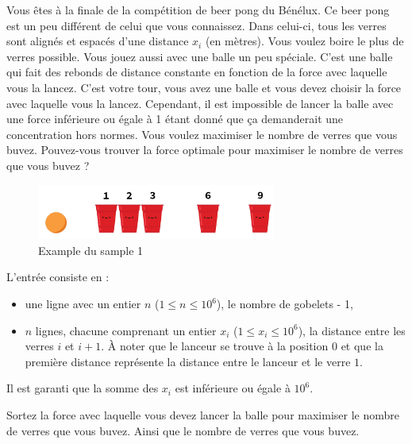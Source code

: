 \problemname{\problemyamlname}


\newcommand{\maxn}{10^{6}}

Vous êtes à la finale de la compétition de beer pong du Bénélux. Ce beer pong est un peu différent de celui que vous connaissez. Dans celui-ci, tous les verres sont alignés et espacés d'une distance $x_i$ (en mètres). Vous voulez boire le plus de verres possible. Vous jouez aussi avec une balle un peu spéciale. C'est une balle qui fait des rebonds de distance constante en fonction de la force avec laquelle vous la lancez.
C'est votre tour, vous avez une balle et vous devez choisir la force avec laquelle vous la lancez. Cependant, il est impossible de lancer la balle avec une force inférieure ou égale à 1 étant donné que ça demanderait une concentration hors normes. Vous voulez maximiser le nombre de verres que vous buvez. Pouvez-vous trouver la force optimale pour maximiser le nombre de verres que vous buvez ?
\smallskip
\begin{figure}[h]
    \centering
    \includegraphics[width=0.7\textwidth]{illustration.png}
    \caption{Example du sample 1}
\end{figure}

\begin{Input}
    L'entrée consiste en :
    \begin{itemize}
        \item une ligne avec un entier  $n$ ($1\leq n\leq \maxn$), le nombre de gobelets - 1,
        \item $n$ lignes, chacune comprenant un entier $x_i$ ($1\leq x_i\leq \maxn$), la distance entre les verres $i$ et $i+1$. À noter que le lanceur se trouve à la position $0$ et que la première distance représente la distance entre le lanceur et le verre $1$.
    \end{itemize}
    Il est garanti que la somme des $x_i$ est inférieure ou égale à $\maxn$.
\end{Input}

\begin{Output}
    Sortez la force avec laquelle vous devez lancer la balle pour maximiser le nombre de verres que vous buvez. Ainsi que le nombre de verres que vous buvez.
\end{Output}

